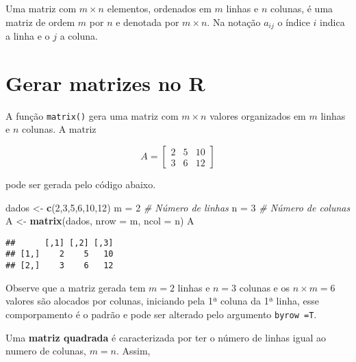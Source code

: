 \documentclass[
]{book}
\newenvironment{Shaded}{\begin{snugshade}}{\end{snugshade}}
\newcommand{\CommentTok}[1]{\textcolor[rgb]{0.56,0.35,0.01}{\textit{#1}}}
\newcommand{\DataTypeTok}[1]{\textcolor[rgb]{0.13,0.29,0.53}{#1}}
\newcommand{\DecValTok}[1]{\textcolor[rgb]{0.00,0.00,0.81}{#1}}
\newcommand{\KeywordTok}[1]{\textcolor[rgb]{0.13,0.29,0.53}{\textbf{#1}}}
\newcommand{\NormalTok}[1]{#1}
\newcommand{\StringTok}[1]{\textcolor[rgb]{0.31,0.60,0.02}{#1}}
\begin{document}
Uma matriz com \(m \times n\) elementos, ordenados em \(m\) linhas e \(n\) colunas, é uma matriz de ordem \(m\) por \(n\) e denotada por \(m \times n\). Na notação \(a_{ij}\) o índice \(i\) indica a linha e o \(j\) a coluna.

\hypertarget{gerar-matrizes-no-r}{%
\section{Gerar matrizes no R}\label{gerar-matrizes-no-r}}

A função \texttt{matrix()} gera uma matriz com \(m \times n\) valores organizados em \(m\) linhas e \(n\) colunas. A matriz

\begin{equation*}
A = 
\begin{bmatrix}
2 & 5 & 10 \\
3 & 6 & 12
\end{bmatrix}
\end{equation*}

pode ser gerada pelo código abaixo.

\begin{Shaded}
\begin{Highlighting}[]
\NormalTok{dados \textless{}{-}}\StringTok{ }\KeywordTok{c}\NormalTok{(}\DecValTok{2}\NormalTok{,}\DecValTok{3}\NormalTok{,}\DecValTok{5}\NormalTok{,}\DecValTok{6}\NormalTok{,}\DecValTok{10}\NormalTok{,}\DecValTok{12}\NormalTok{)}
\NormalTok{m =}\StringTok{ }\DecValTok{2} \CommentTok{\# Número de linhas}
\NormalTok{n =}\StringTok{ }\DecValTok{3} \CommentTok{\# Número de colunas }
\NormalTok{A \textless{}{-}}\StringTok{ }\KeywordTok{matrix}\NormalTok{(dados, }\DataTypeTok{nrow =}\NormalTok{ m, }\DataTypeTok{ncol =}\NormalTok{ n)}
\NormalTok{A}
\end{Highlighting}
\end{Shaded}

\begin{verbatim}
##      [,1] [,2] [,3]
## [1,]    2    5   10
## [2,]    3    6   12
\end{verbatim}

Observe que a matriz gerada tem \(m=2\) linhas e \(n=3\) colunas e os \(n\times m = 6\) valores são alocados por colunas, iniciando pela 1ª coluna da 1ª linha, esse comporpamento é o padrão e pode ser alterado pelo argumento \texttt{byrow\ =T}.

Uma \textbf{matriz quadrada} é caracterizada por ter o número de linhas igual ao numero de colunas, \(m = n\). Assim,
\end{document}
